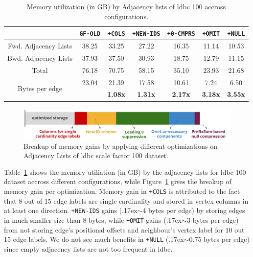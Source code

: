 \begin{table}
	\centering
	\bgroup
	\setlength{\tabcolsep}{8pt}
	\def\arraystretch{1.2}%
	\begin{tabular}{ |c|c|c|c|c|c|c| } 
		\hline
		& \texttt{GF-OLD} & \texttt{+COLS} & \texttt{+NEW-IDS} & \texttt{+0-CMPRS} & \texttt{+OMIT}& \texttt{+NULL} \\ 
		\hline \hline
		Fwd. Adjacency Lists& 38.25 & 33.25 & 27.22 & 16.35 & 11.14 & 10.53 \\ 
		\hline
		Bwd. Adjacency Lists& 37.93 & 37.50 & 30.93 & 18.75 & 12.79 & 11.15 \\ 
		\hline
		Total& 76.18 & 70.75 & 58.15 & 35.10 & 23.93 & 21.68 \\ 
		\hline \hline
		\multirow{2}{80pt}{Bytes per edge}& 23.04 & 21.39 & 17.58 & 10.61 & 7.24 & 6.50 \\ 
		& & \textbf{1.08x} & \textbf{1.31x} & \textbf{2.17x} & \textbf{3.18x} & \textbf{3.55x} \\ 
		\hline
	\end{tabular}
	\egroup
	\captionsetup{justification=centering}
	\caption{Memory utilization (in GB) by Adjacency lists of \gls{ldbc} 100 accross configurations. }
	\label{tbl:mem1}
\end{table}

\begin{figure}
	\centering
	\includegraphics[scale=0.75]{img/opti-breakup}
	\captionsetup{justification=centering}
	\caption{Breakup of memory gains by applying different optimizations on Adjacency Lists of \gls{ldbc} scale factor 100 dataset.}
	\label{fig:opti-breakup}
\end{figure}

Table~\ref{tbl:mem1} shows the memory utiliation (in GB) by the adjacency lists for \gls{ldbc} 100 dataset accross different configurations, while Figure~\ref{fig:opti-breakup} gives the breakup of memory gain per optimization. Memory gain in \texttt{+COLS} is attributed to the fact that 8 out of 15 edge labels are single cardinality and stored in vertex columns in at least one direction. \texttt{+NEW-IDS} gains ({\raise.17ex\hbox{$\scriptstyle\sim$}}4 bytes per edge) by storing edges in much smaller size than 8 bytes, while \texttt{+OMIT} gains ({\raise.17ex\hbox{$\scriptstyle\sim$}}3 bytes per edge) from not storing edge's positional offsets and neighbour's vertex label for 10 out 15 edge labels. We do not see much benefits in \texttt{+NULL} ({\raise.17ex\hbox{$\scriptstyle\sim$}}0.75 bytes per edge) since empty adjacency lists are not too frequent in \gls{ldbc}. 

